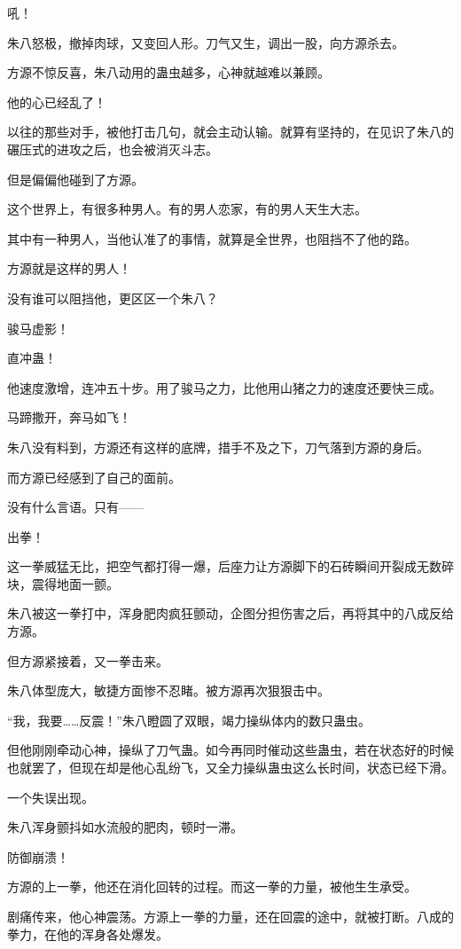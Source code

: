 \begin{this_body}
吼！

朱八怒极，撤掉肉球，又变回人形。刀气又生，调出一股，向方源杀去。

方源不惊反喜，朱八动用的蛊虫越多，心神就越难以兼顾。

他的心已经乱了！

以往的那些对手，被他打击几句，就会主动认输。就算有坚持的，在见识了朱八的碾压式的进攻之后，也会被消灭斗志。

但是偏偏他碰到了方源。

这个世界上，有很多种男人。有的男人恋家，有的男人天生大志。

其中有一种男人，当他认准了的事情，就算是全世界，也阻挡不了他的路。

方源就是这样的男人！

没有谁可以阻挡他，更区区一个朱八？

骏马虚影！

直冲蛊！

他速度激增，连冲五十步。用了骏马之力，比他用山猪之力的速度还要快三成。

马蹄撒开，奔马如飞！

朱八没有料到，方源还有这样的底牌，措手不及之下，刀气落到方源的身后。

而方源已经感到了自己的面前。

没有什么言语。只有——

出拳！

这一拳威猛无比，把空气都打得一爆，后座力让方源脚下的石砖瞬间开裂成无数碎块，震得地面一颤。

朱八被这一拳打中，浑身肥肉疯狂颤动，企图分担伤害之后，再将其中的八成反给方源。

但方源紧接着，又一拳击来。

朱八体型庞大，敏捷方面惨不忍睹。被方源再次狠狠击中。

“我，我要……反震！”朱八瞪圆了双眼，竭力操纵体内的数只蛊虫。

但他刚刚牵动心神，操纵了刀气蛊。如今再同时催动这些蛊虫，若在状态好的时候也就罢了，但现在却是他心乱纷飞，又全力操纵蛊虫这么长时间，状态已经下滑。

一个失误出现。

朱八浑身颤抖如水流般的肥肉，顿时一滞。

防御崩溃！

方源的上一拳，他还在消化回转的过程。而这一拳的力量，被他生生承受。

剧痛传来，他心神震荡。方源上一拳的力量，还在回震的途中，就被打断。八成的拳力，在他的浑身各处爆发。


\end{this_body}
